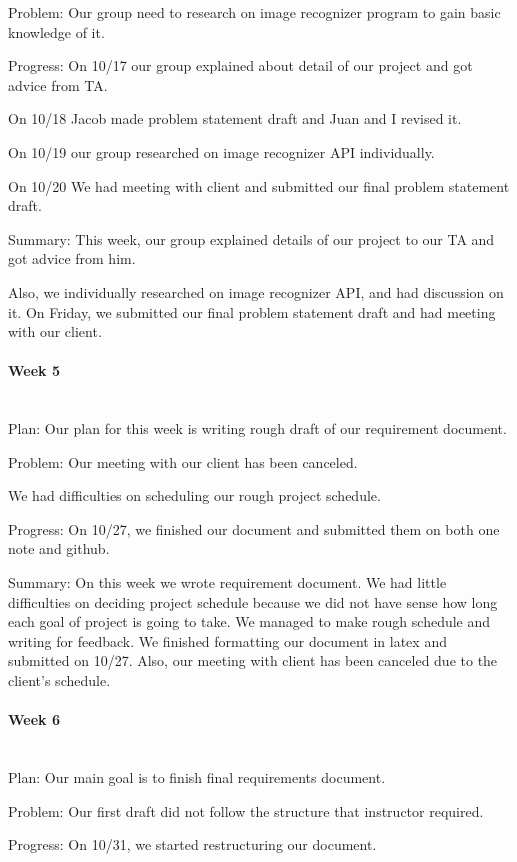 \documentclass[article, onecolumn, draftclsnofoot,10pt, compsoc]{IEEEtran}
\begin{document}
Problem: Our group need to research on image recognizer program to gain basic knowledge of it.

Progress: On 10/17 our group explained about detail of our project and got advice from TA.

On 10/18 Jacob made problem statement draft and Juan and I revised it.

On 10/19 our group researched on image recognizer API individually.

On 10/20 We had meeting with client and submitted our final problem statement draft.

Summary: This week, our group explained details of our project to our TA and got advice from him.

Also, we individually researched on image recognizer API, and had discussion on it. On Friday, we submitted our final problem statement draft and had meeting with our client.

\paragraph{Week 5}
\mbox{}\\
Plan: Our plan for this week is writing rough draft of our requirement document.

Problem: Our meeting with our client has been canceled.

We had difficulties on scheduling our rough project schedule.

Progress: On 10/27, we finished our document and submitted them on both one note and github.

Summary: On this week we wrote requirement document. We had little difficulties on deciding project schedule because we did not have sense how long each goal of project is going to take. We managed to make rough schedule and writing for feedback. We finished formatting our document in latex and submitted on 10/27. Also, our meeting with client has been canceled due to the client's schedule.

\paragraph{Week 6}
\mbox{}\\
Plan: Our main goal is to finish final requirements document.

Problem: Our first draft did not follow the structure that instructor required.

Progress: On 10/31, we started restructuring our document.
\end{document}
